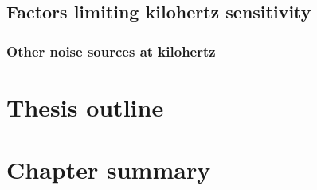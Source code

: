 \subsection{Factors limiting kilohertz sensitivity}


\subsubsection{Other noise sources at kilohertz} %

\section{Thesis outline}


\section{Chapter summary}

